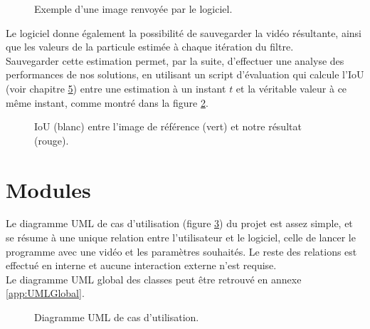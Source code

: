 \begin{figure}[!htbp]
\center
\caption{Exemple d'une image renvoyée par le logiciel.}
\label{fig:soft_result}
\end{figure}
\FloatBarrier

Le logiciel donne également la possibilité de sauvegarder la vidéo résultante, ainsi que les valeurs de la particule estimée à chaque itération du filtre.\\
Sauvegarder cette estimation permet, par la suite, d'effectuer une analyse des performances de nos solutions, en utilisant un script d'évaluation qui calcule l'IoU (voir chapitre \hyperlink{chapter.5}{5}) entre une estimation à un instant $t$ et la véritable valeur à ce même instant, comme montré dans la figure \ref{fig:eval_result}.\\

\begin{figure}[!htbp]
\center
\caption{IoU (blanc) entre l'image de référence (vert) et notre résultat (rouge).}
\label{fig:eval_result}
\end{figure}
\FloatBarrier


\clearpage
\section{Modules}
Le diagramme UML de cas d'utilisation (figure \ref{fig:uml_diagram_usecase}) du projet est assez simple, et se résume à une unique relation entre l'utilisateur et le logiciel, celle de lancer le programme avec une vidéo et les paramètres souhaités. Le reste des relations est effectué en interne et aucune interaction externe n'est requise.\\
Le diagramme UML global des classes peut être retrouvé en annexe \ref{app:UMLGlobal}.

\begin{figure}[!htbp]
\center
\caption{Diagramme UML de cas d'utilisation.}
\label{fig:uml_diagram_usecase}
\end{figure}
\FloatBarrier


